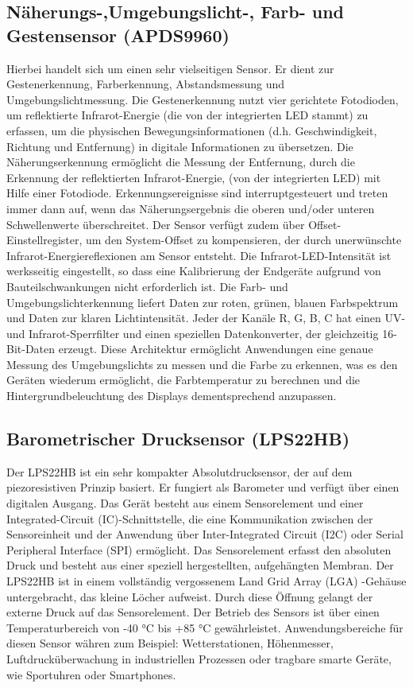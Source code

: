 \subsection{Näherungs-,Umgebungslicht-, Farb- und Gestensensor (APDS9960)}
	Hierbei handelt sich um einen sehr vielseitigen Sensor. Er dient zur Gestenerkennung, Farberkennung, Abstandsmessung und Umgebungslichtmessung. Die Gestenerkennung nutzt vier gerichtete Fotodioden, um reflektierte Infrarot-Energie (die von der integrierten LED stammt) zu erfassen, um die physischen Bewegungsinformationen (d.h. Geschwindigkeit, Richtung und Entfernung) in digitale Informationen zu übersetzen. Die Näherungserkennung ermöglicht die Messung der Entfernung, durch die Erkennung der reflektierten Infrarot-Energie, (von der integrierten LED) mit Hilfe einer Fotodiode. Erkennungsereignisse sind interruptgesteuert und treten immer dann auf, wenn das Näherungsergebnis die oberen und/oder unteren Schwellenwerte überschreitet. Der Sensor verfügt zudem über Offset-Einstellregister, um den System-Offset zu kompensieren, der durch unerwünschte Infrarot-Energiereflexionen am Sensor entsteht. Die Infrarot-LED-Intensität ist werksseitig eingestellt, so dass eine Kalibrierung der Endgeräte aufgrund von Bauteilschwankungen nicht erforderlich ist.	Die Farb- und Umgebungslichterkennung liefert Daten zur roten, grünen, blauen Farbspektrum und Daten zur klaren Lichtintensität. Jeder der Kanäle R, G, B, C hat einen UV- und Infrarot-Sperrfilter und einen speziellen Datenkonverter, der gleichzeitig 16-Bit-Daten erzeugt. Diese Architektur ermöglicht Anwendungen eine genaue Messung des Umgebungslichts zu messen und die Farbe zu erkennen, was es den Geräten wiederum ermöglicht, die Farbtemperatur zu berechnen und die Hintergrundbeleuchtung des Displays dementsprechend anzupassen.\cite{AT}
\subsection{Barometrischer Drucksensor (LPS22HB)}
	Der LPS22HB ist ein sehr kompakter Absolutdrucksensor, der auf dem piezoresistiven Prinzip basiert. Er fungiert als Barometer und verfügt über einen digitalen Ausgang. Das Gerät besteht aus einem Sensorelement und einer Integrated-Circuit (IC)-Schnittstelle, die eine Kommunikation zwischen der Sensoreinheit und der Anwendung über Inter-Integrated Circuit (I2C) oder Serial Peripheral Interface (SPI) ermöglicht. Das Sensorelement erfasst den absoluten Druck und besteht aus einer speziell hergestellten, aufgehängten Membran. Der LPS22HB ist in einem vollständig vergossenem Land Grid Array (LGA) -Gehäuse untergebracht, das kleine Löcher aufweist. Durch diese Öffnung gelangt der externe Druck auf das Sensorelement. Der Betrieb des Sensors ist über einen Temperaturbereich von -40 °C bis +85 °C gewährleistet.\cite{STM2}
	Anwendungsbereiche für diesen Sensor währen zum Beispiel: Wetterstationen, Höhenmesser, Luftdrucküberwachung in industriellen Prozessen oder tragbare smarte Geräte, wie Sportuhren oder Smartphones.
